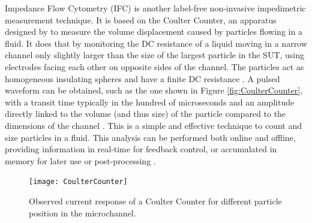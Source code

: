 Impedance Flow Cytometry (IFC) is another label-free non-invasive impedimetric measurement technique. It is based on the Coulter Counter, an apparatus designed by \citep{coulter1956high} to measure the volume displacement caused by particles flowing in a fluid. It does that by monitoring the DC resistance of a liquid moving in a narrow channel only slightly larger than the size of the largest particle in the SUT, using electrodes facing each other on opposite sides of the channel. The particles act as homogeneous insulating spheres and have a finite DC resistance \cite{deblois1970counting, Xu2016,Gawad2004}. A pulsed waveform can be obtained, such as the one shown in Figure \autoref{fig:CoulterCounter}, with a transit time typically in the hundred of microseconds and an amplitude directly linked to the volume (and thus size) of the particle compared to the dimensions of the channel \cite{Carminati2017}. This is a simple and effective technique to count and size particles in a fluid. This analysis can be performed both online and offline, providing information in real-time for feedback control, or accumulated in memory for later use or post-processing \cite{david2012viability,Opitz2019}. \par
\begin{figure}[h]
    \centering
    \texttt{[image: CoulterCounter]}
    \caption{Observed current response of a Coulter Counter for different particle position in the microchannel.}
    \label{fig:CoulterCounter}
\end{figure}


